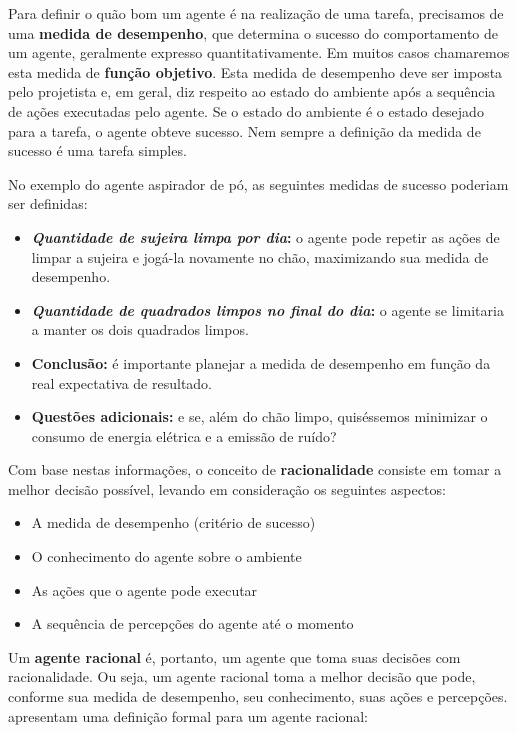 Para definir o quão bom um agente é na realização de uma tarefa, precisamos de uma \textbf{medida de desempenho}, que determina o sucesso do comportamento de um agente, geralmente expresso quantitativamente. Em muitos casos chamaremos esta medida de \textbf{função objetivo}. Esta medida de desempenho deve ser imposta pelo projetista e, em geral, diz respeito ao estado do ambiente após a sequência de ações executadas pelo agente. Se o estado do ambiente é o estado desejado para a tarefa, o agente obteve sucesso. Nem sempre a definição da medida de sucesso é uma tarefa simples.

No exemplo do agente aspirador de pó, as seguintes medidas de sucesso poderiam ser definidas:
\begin{itemize}
	\item \textbf{\textit{Quantidade de sujeira limpa por dia}:} o agente pode repetir as ações de limpar a sujeira e jogá-la novamente no chão, maximizando sua medida de desempenho.
	\item \textbf{\textit{Quantidade de quadrados limpos no final do dia}:} o agente se limitaria a manter os dois quadrados limpos.
	\item \textbf{Conclusão:} é importante planejar a medida de desempenho em função da real expectativa de resultado.
	\item \textbf{Questões adicionais:} e se, além do chão limpo, quiséssemos minimizar o consumo de energia elétrica e a emissão de ruído?
\end{itemize}

\insertspace

Com base nestas informações, o conceito de \textbf{racionalidade} consiste em tomar a melhor decisão possível, levando em consideração os seguintes aspectos:
\begin{itemize}
	\item A medida de desempenho (critério de sucesso)
	\item O conhecimento do agente sobre o ambiente
	\item As ações que o agente pode executar
	\item A sequência de percepções do agente até o momento
\end{itemize}

\insertspace

Um \textbf{agente racional} é, portanto, um agente que toma suas decisões com racionalidade. Ou seja, um agente racional toma a melhor decisão que pode, conforme sua medida de desempenho, seu conhecimento, suas ações e percepções. \citet{RusselAndNorvig2010} apresentam uma definição formal para um agente racional:

